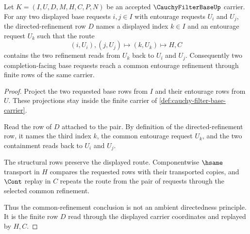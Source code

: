 \begin{theorem}
\label{thm:cauchy-filter-base-entourage-refinement}
Let $K=(I,U,D,M,H,C,P,N)$ be an accepted $\CauchyFilterBaseUp$ carrier. For any two displayed base requests $i,j\in I$ with entourage requests $U_i$ and $U_j$, the directed-refinement row $D$ names a displayed index $k\in I$ and an entourage request $U_k$ such that the route
$$
(i,U_i),(j,U_j) \longmapsto (k,U_k) \longmapsto H,C
$$
contains the two refinement reads from $U_k$ back to $U_i$ and $U_j$. Consequently two completion-facing base requests reach a common entourage refinement through finite rows of the same carrier.
\end{theorem}
\begin{proof}
Project the two requested base rows from $I$ and their entourage rows from $U$. These projections stay inside the finite carrier of \autoref{def:cauchy-filter-base-carrier}.

Read the row of $D$ attached to the pair. By definition of the directed-refinement row, it names the third index $k$, the common entourage request $U_k$, and the two containment reads back to $U_i$ and $U_j$.

The structural rows preserve the displayed route. Componentwise $\hsame$ transport in $H$ compares the requested rows with their transported copies, and $\Cont$ replay in $C$ repeats the route from the pair of requests through the selected common refinement.

Thus the common-refinement conclusion is not an ambient directedness principle. It is the finite row $D$ read through the displayed carrier coordinates and replayed by $H,C$.
\end{proof}

